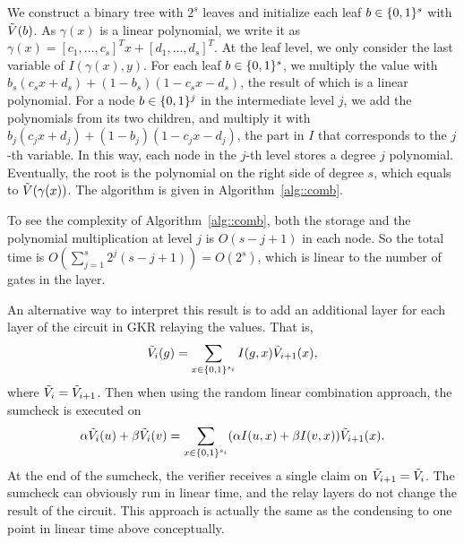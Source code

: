 We construct a binary tree with $2^s$ leaves and initialize each leaf $b\in\{0,1\}^s$ with $\tilde{V}(b)$. As $\gamma(x)$ is a linear polynomial, we write it as $\gamma(x) = [c_1, \ldots, c_s]^T x+ [d_1, \ldots, d_s]^T$. At the leaf level, we only consider the last variable of $I(\gamma(x), y)$. For each leaf $b\in\{0,1\}^s$, we multiply the value with $b_s(c_s x+ d_s)+(1-b_s)(1-c_s x- d_s)$, the result of which is a linear polynomial. For a node $b\in\{0,1\}^j$ in the intermediate level $j$, we add the polynomials from its two children, and multiply it with $b_j(c_j x+ d_j)+(1-b_j)(1-c_j x- d_j)$, the part in $I$ that corresponds to the $j$-th variable. In this way, each node in the $j$-th level stores a degree $j$ polynomial. Eventually, the root is the polynomial on the right side of degree $s$, which equals to $\tilde{V}(\gamma(x))$. The algorithm is given in Algorithm~\ref{alg::comb}. 

To see the complexity of Algorithm~\ref{alg::comb}, both the storage and the polynomial multiplication at level $j$ is $O(s-j+1)$ in each node. So the total time is $O(\sum_{j=1}^s 2^j (s-j+1)) = O(2^s)$, which is linear to the number of gates in the layer.

An alternative way to interpret this result is to add an additional layer for each layer of the circuit in GKR relaying the values. That is, $$\tilde{V}_{i}(g) = \sum_{x\in\{0,1\}^{s_i}}I(g,x)\tilde{V}_{i+1}(x),$$ where $\tilde{V}_i = \tilde{V}_{i+1}$. Then when using the random linear combination approach, the sumcheck is executed on $$\alpha\tilde{V}_{i}(u)+\beta\tilde{V}_i(v) = \sum_{x\in\{0,1\}^{s_i}}(\alpha I(u,x)+\beta I(v,x))\tilde{V}_{i+1}(x).$$
At the end of the sumcheck, the verifier receives a single claim on $\tilde{V}_{i+1} = \tilde{V}_{i}$. The sumcheck can obviously run in linear time, and the relay layers do not change the result of the circuit. This approach is actually the same as the condensing to one point in linear time above conceptually. 










